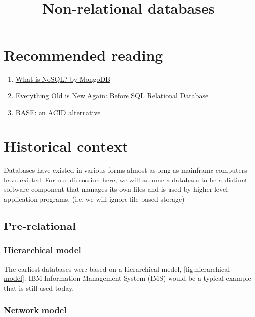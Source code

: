 \documentclass{pgnotes}
\title{Non-relational databases}
\begin{document}
\maketitle

\section*{Recommended reading}

\begin{enumerate}
\item \href{https://www.mongodb.com/nosql-explained}{What is NoSQL? by MongoDB}
\item \href{https://www.zoomdata.com/master-class/architecture-and-deployment/everything-old-new-again-sql-relational-database/}{Everything Old is New Again: Before SQL Relational Database}
\item BASE: an ACID alternative \citep{pritchett:2008:base}
\end{enumerate}

\section{Historical context}

Databases have existed in various forms almost as long as mainframe computers have existed.
For our discussion here, we will assume a database to be a distinct software component that manages its own files and is used by higher-level application programs.
(i.e. we will ignore file-based storage)

\subsection{Pre-relational}

\subsubsection{Hierarchical model}

The earliest databases were based on a hierarchical model, \autoref{fig:hierarchical-model}.
IBM Information Management System (IMS) would be a typical example that is still used today. 


\subsubsection{Network model}
\end{document}
